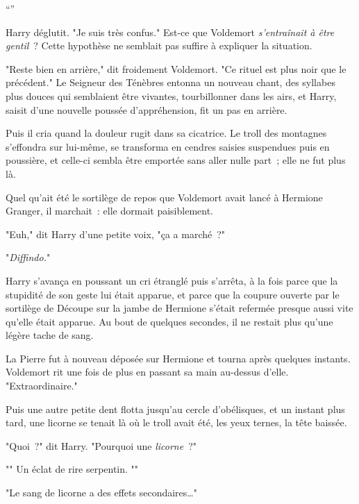 “”

Harry déglutit. "Je suis très confus." Est-ce que Voldemort \emph{s'entraînait à être gentil}~? Cette hypothèse ne semblait pas suffire à expliquer la situation.

"Reste bien en arrière," dit froidement Voldemort. "Ce rituel est plus noir que le précédent." Le Seigneur des Ténèbres entonna un nouveau chant, des syllabes plus douces qui semblaient être vivantes, tourbillonner dans les airs, et Harry, saisit d'une nouvelle poussée d'appréhension, fit un pas en arrière.

Puis il cria quand la douleur rugit dans sa cicatrice. Le troll des montagnes s'effondra sur lui-même, se transforma en cendres saisies suspendues puis en poussière, et celle-ci sembla être emportée sans aller nulle part~; elle ne fut plus là.

Quel qu'ait été le sortilège de repos que Voldemort avait lancé à Hermione Granger, il marchait~: elle dormait paisiblement.

"Euh," dit Harry d'une petite voix, "ça a marché~?"

"\emph{Diffindo.}"

Harry s'avança en poussant un cri étranglé puis s'arrêta, à la fois parce que la stupidité de son geste lui était apparue, et parce que la coupure ouverte par le sortilège de Découpe sur la jambe de Hermione s'était refermée presque aussi vite qu'elle était apparue. Au bout de quelques secondes, il ne restait plus qu'une légère tache de sang.

La Pierre fut à nouveau déposée sur Hermione et tourna après quelques instants. Voldemort rit une fois de plus en passant sa main au-dessus d'elle. "Extraordinaire."

Puis une autre petite dent flotta jusqu'au cercle d'obélisques, et un instant plus tard, une licorne se tenait là où le troll avait été, les yeux ternes, la tête baissée.

"Quoi~?" dit Harry. "Pourquoi une \emph{licorne}~?"

"" Un éclat de rire serpentin. ""

"Le sang de licorne a des effets secondaires…"

